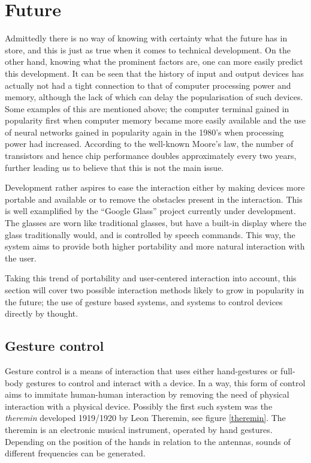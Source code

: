 
\section{Future}
\label{future}
Admittedly there is no way of knowing with certainty what the future has in store, and this is just as true when it comes to technical development. On the other hand, knowing what the prominent factors are, one can more easily predict this development. It can be seen that the history of input and output devices has actually not had a tight connection to that of computer processing power and memory, although the lack of which can delay the popularisation of such devices. Some examples of this are mentioned above; the computer terminal gained in popularity first when computer memory became more easily available and the use of neural networks gained in popularity again in the 1980's when processing power had increased. According to the well-known Moore's law, the number of transistors and hence chip performance doubles approximately every two years, further leading us to believe that this is not the main issue.

Development rather aspires to ease the interaction either by making devices more portable and available or to remove the obstacles present in the interaction. This is well examplified by the ``Google Glass'' project currently under development. The glasses are worn like traditional glasses, but have a built-in display where the glass traditionally would, and is controlled by speech commands. This way, the system aims to provide both higher portability and more natural interaction with the user.

Taking this trend of portability and user-centered interaction into account, this section will cover two possible interaction methods likely to grow in popularity in the future; the use of gesture based systems, and systems to control devices directly by thought. 


\subsection{Gesture control}
Gesture control is a means of interaction that uses either hand-gestures or full-body gestures to control and interact with a device. In a way, this form of control aims to immitate human-human interaction by removing the need of physical interaction with a physical device. Possibly the first such system was the \emph{theremin} developed 1919/1920 by Leon Theremin, see figure \ref{theremin}. The theremin is an electronic musical instrument, operated by hand gestures. Depending on the position of the hands in relation to the antennas, sounds of different frequencies can be generated\cite{thereminpatent}.

